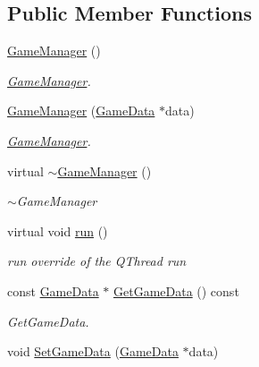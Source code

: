 \subsection*{Public Member Functions}
\begin{DoxyCompactItemize}
\item 
\hypertarget{classGameManager_aa0e2424dc1a39d380e5b6605b179bf05}{\hyperlink{classGameManager_aa0e2424dc1a39d380e5b6605b179bf05}{Game\-Manager} ()}\label{classGameManager_aa0e2424dc1a39d380e5b6605b179bf05}

\begin{DoxyCompactList}\small\item\em \hyperlink{classGameManager}{Game\-Manager}. \end{DoxyCompactList}\item 
\hyperlink{classGameManager_a80046eb2f443289f0ba1b3fa1272470a}{Game\-Manager} (\hyperlink{classGameData}{Game\-Data} $\ast$data)
\begin{DoxyCompactList}\small\item\em \hyperlink{classGameManager}{Game\-Manager}. \end{DoxyCompactList}\item 
\hypertarget{classGameManager_aaae63e38e358379c1fe507c5197a8435}{virtual \hyperlink{classGameManager_aaae63e38e358379c1fe507c5197a8435}{$\sim$\-Game\-Manager} ()}\label{classGameManager_aaae63e38e358379c1fe507c5197a8435}

\begin{DoxyCompactList}\small\item\em $\sim$\-Game\-Manager \end{DoxyCompactList}\item 
\hypertarget{classGameManager_abbde8090c24ca199815ba1e85059c96f}{virtual void \hyperlink{classGameManager_abbde8090c24ca199815ba1e85059c96f}{run} ()}\label{classGameManager_abbde8090c24ca199815ba1e85059c96f}

\begin{DoxyCompactList}\small\item\em run override of the Q\-Thread run \end{DoxyCompactList}\item 
const \hyperlink{classGameData}{Game\-Data} $\ast$ \hyperlink{classGameManager_a51bd111f72c164d392db25e1b9bab86e}{Get\-Game\-Data} () const 
\begin{DoxyCompactList}\small\item\em Get\-Game\-Data. \end{DoxyCompactList}\item 
\hypertarget{classGameManager_a760b12229d3d010a81507a07760a4315}{void \hyperlink{classGameManager_a760b12229d3d010a81507a07760a4315}{Set\-Game\-Data} (\hyperlink{classGameData}{Game\-Data} $\ast$data)}\label{classGameManager_a760b12229d3d010a81507a07760a4315}


\end{DoxyCompactItemize}
